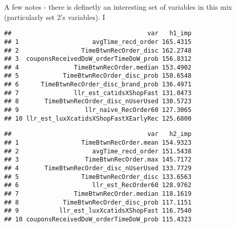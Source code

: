 \documentclass[10pt]{report}
\newenvironment{Shaded}{}{}
\newcommand{\KeywordTok}[1]{\textcolor[rgb]{0.00,0.44,0.13}{\textbf{{#1}}}}
\newcommand{\DecValTok}[1]{\textcolor[rgb]{0.25,0.63,0.44}{{#1}}}
\newcommand{\StringTok}[1]{\textcolor[rgb]{0.25,0.44,0.63}{{#1}}}
\newcommand{\NormalTok}[1]{{#1}}
\begin{document}
A few notes - there is definetly an interesting set of variables in this
mix (particularly set 2's variables). I

\begin{Shaded}
\end{Shaded}

\begin{verbatim}
##                                     var   h1_imp
## 1                    avgTime_recd_order 165.4315
## 2                 TimeBtwnRecOrder_disc 162.2748
## 3  couponsReceivedDoW_orderTimeDoW_prob 156.8312
## 4               TimeBtwnRecOrder.median 153.4902
## 5            TimeBtwnRecOrder_disc_prob 150.6548
## 6      TimeBtwnRecOrder_disc_brand_prob 136.4971
## 7               llr_est_catidsXShopFast 131.0473
## 8       TimeBtwnRecOrder_disc_nUserUsed 130.5723
## 9                  llr_naive_RecOrder60 127.3065
## 10 llr_est_luxXcatidsXShopFastXEarlyRec 125.6800
\end{verbatim}

\begin{Shaded}
\end{Shaded}

\begin{verbatim}
##                                     var   h2_imp
## 1                 TimeBtwnRecOrder.mean 154.9323
## 2                    avgTime_recd_order 151.5438
## 3                  TimeBtwnRecOrder.max 145.7172
## 4       TimeBtwnRecOrder_disc_nUserUsed 133.7729
## 5                 TimeBtwnRecOrder_disc 133.6563
## 6                    llr_est_RecOrder60 128.9762
## 7               TimeBtwnRecOrder.median 118.1619
## 8            TimeBtwnRecOrder_disc_prob 117.1151
## 9           llr_est_luxXcatidsXShopFast 116.7540
## 10 couponsReceivedDoW_orderTimeDoW_prob 115.4323
\end{verbatim}
\end{document}
